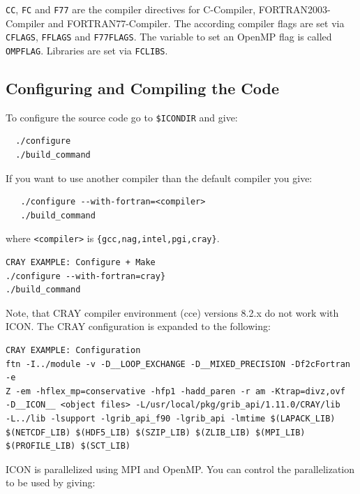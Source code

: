 \verb+CC+, \verb+FC+ and \verb+F77+ are the compiler directives for C-Compiler, FORTRAN2003-Compiler and FORTRAN77-Compiler. The according compiler flags are set via \verb+CFLAGS+, \verb+FFLAGS+ and \verb+F77FLAGS+. The variable to set an OpenMP flag is called \verb+OMPFLAG+. Libraries are set via \verb+FCLIBS+. 

\subsection{Configuring and Compiling the Code} \label{sec:config_compile}

To configure the source code go to \verb+$ICONDIR+ and give:

\begin{small}
 \begin{verbatim}
  ./configure
  ./build_command
  \end{verbatim}
\end{small}

If you want to use another compiler than the default compiler you give:

\begin{small}
  \begin{verbatim}
   ./configure --with-fortran=<compiler>
   ./build_command
  \end{verbatim}
\end{small}

where \verb+<compiler>+ is \verb+{gcc,nag,intel,pgi,cray}+.

\begin{Verbatim}[frame=single]
CRAY EXAMPLE: Configure + Make
./configure --with-fortran=cray}
./build_command
\end{Verbatim}

Note, that CRAY compiler environment (cce) versions 8.2.x do not work with ICON. The CRAY configuration is expanded to the following:

\begin{Verbatim}[frame=single]
CRAY EXAMPLE: Configuration
ftn -I../module -v -D__LOOP_EXCHANGE -D__MIXED_PRECISION -Df2cFortran -e 
Z -em -hflex_mp=conservative -hfp1 -hadd_paren -r am -Ktrap=divz,ovf 
-D__ICON__ <object files> -L/usr/local/pkg/grib_api/1.11.0/CRAY/lib  
-L../lib -lsupport -lgrib_api_f90 -lgrib_api -lmtime $(LAPACK_LIB) 
$(NETCDF_LIB) $(HDF5_LIB) $(SZIP_LIB) $(ZLIB_LIB) $(MPI_LIB) 
$(PROFILE_LIB) $(SCT_LIB)
\end{Verbatim}

ICON is parallelized using MPI and OpenMP. You can control the parallelization to be used by giving:

